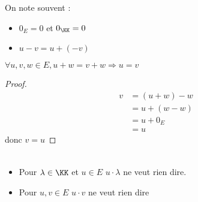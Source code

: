 \documentclass[../main.tex]{subfile}
\begin{document}
\begin{nota}
	On note souvent :
\begin{itemize}
	\item $0_E = 0$ et $0_\KK = 0$
	\item $u - v = u + (-v)$
\end{itemize}
\end{nota}

\begin{lemme}
	$\forall u, v, w \in E, u + w = v + w \Rightarrow u = v$
\end{lemme}

\begin{proof}
	$$
\begin{aligned}
	v &= (u + w) - w\\
	&= u + (w - w)\\
	&= u + 0_E\\
	&= u
\end{aligned}
	$$
	donc $v = u$
\end{proof}

\begin{rema}
$\phantom{a}$
\begin{itemize}
	\item Pour $\lambda \in \KK$ et $u \in E$
	$u \cdot \lambda$ ne veut rien dire.

	\item Pour $u, v \in E$
	$u \cdot v$ ne veut rien dire
\end{itemize}
\end{rema}
\end{document}
